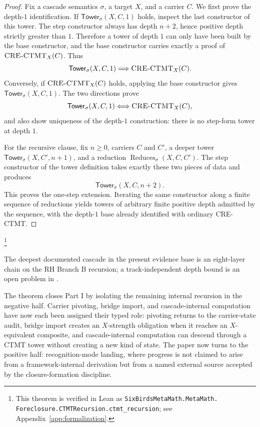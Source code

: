 \documentclass[11pt]{article}
\newcommand{\CRECTMT}{\textsc{CRE-CTMT}}
\theoremstyle{definition}
\begin{document}
\begin{proof}
Fix a cascade semantics \(\sigma\), a target \(X\), and a carrier
\(C\).  We first prove the depth-\(1\) identification.  If
\(\mathsf{Tower}_{\sigma}(X,C,1)\) holds, inspect the last constructor
of this tower.  The step constructor always has depth \(n+2\), hence
positive depth strictly greater than \(1\).  Therefore a tower of depth
\(1\) can only have been built by the base constructor, and the base
constructor carries exactly a proof of \(\mbox{\CRECTMT}_X(C)\).
Thus
\[
  \mathsf{Tower}_{\sigma}(X,C,1)
  \Longrightarrow \mbox{\CRECTMT}_X(C).
\]
Conversely, if \(\mbox{\CRECTMT}_X(C)\) holds, applying the base
constructor gives \(\mathsf{Tower}_{\sigma}(X,C,1)\).  The two
directions prove
\[
  \mathsf{Tower}_{\sigma}(X,C,1)
  \Longleftrightarrow \mbox{\CRECTMT}_X(C),
\]
and also show uniqueness of the depth-\(1\) construction: there is no
step-form tower at depth \(1\).

For the recursive clause, fix \(n\geq 0\), carriers \(C\) and \(C'\),
a deeper tower
\(\mathsf{Tower}_{\sigma}(X,C',n+1)\), and a reduction
\(\operatorname{Reduces}_{\sigma}(X,C,C')\).  The step constructor of
the tower definition takes exactly these two pieces of data and
produces
\[
  \mathsf{Tower}_{\sigma}(X,C,n+2).
\]
This proves the one-step extension.  Iterating the same constructor
along a finite sequence of reductions yields towers of arbitrary
finite positive depth admitted by the sequence, with the depth-\(1\)
base already identified with ordinary \CRECTMT.
\end{proof}\footnote{\raggedright This theorem is verified in Lean as
\texttt{SixBirdsMetaMath.MetaMath.\allowbreak
Foreclosure.CTMTRecursion.\allowbreak ctmt\_recursion}; see
Appendix~\ref{app:formalization}.}

The
deepest documented cascade in the present evidence base is an
eight-layer chain on the RH Branch B recursion; a track-independent
depth bound is an open problem in .

The theorem closes Part I by isolating the remaining internal
recursion in the negative half.  Carrier pivoting, bridge import, and
cascade-internal computation have now each been assigned their typed
role: pivoting returns to the carrier-state audit, bridge import
creates an \(X\)-strength obligation when it reaches an
\(X\)-equivalent composite, and cascade-internal computation can
descend through a CTMT tower without creating a new kind of state.  The
paper now turns to the positive half: recognition-mode landing, where
progress is not claimed to arise from a framework-internal derivation
but from a named external source accepted by the closure-formation
discipline.
\end{document}
